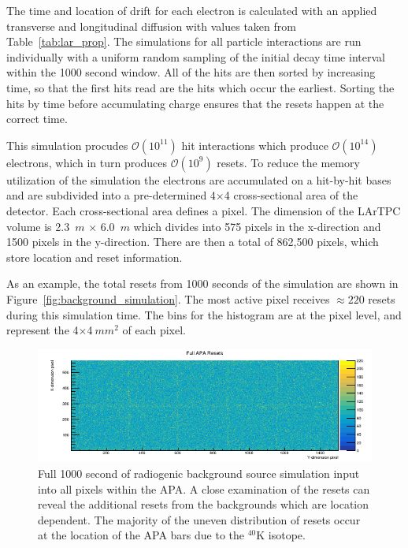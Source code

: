 The time and location of drift for each electron is calculated with an applied transverse and longitudinal diffusion with values taken from Table~\ref{tab:lar_prop}.
The simulations for all particle interactions are run individually with a uniform random sampling of the initial decay time interval within the 1000 second window.
All of the hits are then sorted by increasing time, so that the first hits read are the hits which occur the earliest.
Sorting the hits by time before accumulating charge ensures that the resets happen at the correct time.

This simulation procudes $\mathcal{O}(10^{11})$ hit interactions which produce $\mathcal{O}(10^{14})$ electrons, which in turn produces $\mathcal{O}(10^{9})$ resets.
To reduce the memory utilization of the simulation the electrons are accumulated on a hit-by-hit bases and are subdivided into a pre-determined 4$\times$4 cross-sectional area of the detector.
Each cross-sectional area defines a pixel.
The dimension of the LArTPC volume is 2.3~$\unit{m}$ $\times$ 6.0~$\unit{m}$ which divides into 575 pixels in the x-direction and 1500 pixels in the y-direction.
There are then a total of 862,500 pixels, which store location and reset information.

As an example, the total resets from 1000 seconds of the simulation are shown in Figure~\ref{fig:background_simulation}.
The most active pixel receives $\approx 220$ resets during this simulation time.
The bins for the histogram are at the pixel level, and represent the 4$\times$4$~\unit{mm^{2}}$ of each pixel.

\begin{figure}[]
\centering
\includegraphics[width=\textwidth]{images/fullApaResets.png}
\caption{Full 1000 second of radiogenic background source simulation input into all pixels within the APA.
A close examination of the resets can reveal the additional resets from the backgrounds which are location dependent.
The majority of the uneven distribution of resets occur at the location of the APA bars due to the $^{40}$K isotope.
}
\end{figure}~\label{fig:background_simulation}

